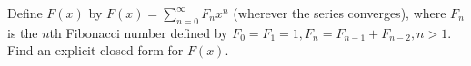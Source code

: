 Define $F(x)$ by $\displaystyle{F(x) = \sum_{n=0}^\infty F_n x^n}$ (wherever
the series converges), where $F_n$ is the $n$th Fibonacci number defined by
$F_0 = F_1 = 1, F_n = F_{n - 1} + F_{n - 2}, n > 1$.  Find an explicit
closed form for $F(x)$.
